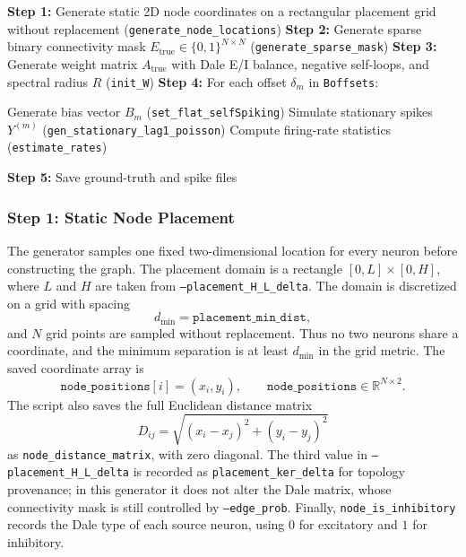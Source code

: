 \documentclass[11pt]{article}
\begin{document}
\begin{algorithm}[H]
\caption{Dale Matrix Generation (\texttt{gen\_daleMatrices3c.py})}
\begin{algorithmic}[1]
\STATE \textbf{Step 1:} Generate static 2D node coordinates on a rectangular
       placement grid without replacement
       (\texttt{generate\_node\_locations})
\STATE \textbf{Step 2:} Generate sparse binary connectivity mask
       $E_{\text{true}} \in \{0,1\}^{N\times N}$
       (\texttt{generate\_sparse\_mask})
\STATE \textbf{Step 3:} Generate weight matrix $A_{\text{true}}$ with
       Dale E/I balance, negative self-loops, and spectral radius $R$
       (\texttt{init\_W})
\STATE \textbf{Step 4:} For each offset $\delta_m$ in \texttt{Boffsets}:
\begin{ALC@g}
  \STATE Generate bias vector $B_m$ (\texttt{set\_flat\_selfSpiking})
  \STATE Simulate stationary spikes $Y^{(m)}$
         (\texttt{gen\_stationary\_lag1\_poisson})
  \STATE Compute firing-rate statistics (\texttt{estimate\_rates})
\end{ALC@g}
\STATE \textbf{Step 5:} Save ground-truth and spike files
\end{algorithmic}
\end{algorithm}

\subsubsection{Step 1: Static Node Placement}
\label{sec:node_placement}

The generator samples one fixed two-dimensional location for every neuron
before constructing the graph. The placement domain is a rectangle
\([0,L]\times[0,H]\), where \(L\) and \(H\) are taken from
\texttt{--placement\_H\_L\_delta}. The domain is discretized on a grid with
spacing
\[
d_{\min}=\texttt{placement\_min\_dist},
\]
and \(N\) grid points are sampled without replacement. Thus no two neurons
share a coordinate, and the minimum separation is at least \(d_{\min}\) in
the grid metric. The saved coordinate array is
\[
\texttt{node\_positions}[i] = (x_i,y_i),\qquad
\texttt{node\_positions}\in\mathbb{R}^{N\times 2}.
\]
The script also saves the full Euclidean distance matrix
\[
D_{ij} = \sqrt{(x_i-x_j)^2 + (y_i-y_j)^2}
\]
as \texttt{node\_distance\_matrix}, with zero diagonal. The third value in
\texttt{--placement\_H\_L\_delta} is recorded as
\texttt{placement\_ker\_delta} for topology provenance; in this generator it
does not alter the Dale matrix, whose connectivity mask is still controlled
by \texttt{--edge\_prob}. Finally, \texttt{node\_is\_inhibitory} records the
Dale type of each source neuron, using \(0\) for excitatory and \(1\) for
inhibitory.
\end{document}
